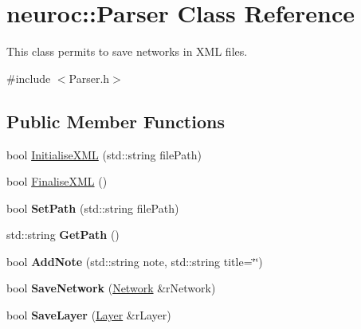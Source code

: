 \hypertarget{classneuroc_1_1_parser}{\section{neuroc\-:\-:Parser Class Reference}
\label{classneuroc_1_1_parser}
}


This class permits to save networks in X\-M\-L files.  




{\ttfamily \#include $<$Parser.\-h$>$}

\subsection*{Public Member Functions}
\begin{DoxyCompactItemize}
\item 
bool \hyperlink{classneuroc_1_1_parser_a58460a6e908e3e7690a7b85cd751c67b}{Initialise\-X\-M\-L} (std\-::string file\-Path)
\item 
bool \hyperlink{classneuroc_1_1_parser_ab4273cb1b6de10c86f2c60035a318d8b}{Finalise\-X\-M\-L} ()
\item 
\hypertarget{classneuroc_1_1_parser_a8aacc61a8f3d1d6f2afcdcc3dbd035c2}{bool {\bfseries Set\-Path} (std\-::string file\-Path)}\label{classneuroc_1_1_parser_a8aacc61a8f3d1d6f2afcdcc3dbd035c2}

\item 
\hypertarget{classneuroc_1_1_parser_a9478c163946c4e27c88e2a36f0ebf3c9}{std\-::string {\bfseries Get\-Path} ()}\label{classneuroc_1_1_parser_a9478c163946c4e27c88e2a36f0ebf3c9}

\item 
\hypertarget{classneuroc_1_1_parser_a1a04b45ac8010c431db0efc810e9cc6e}{bool {\bfseries Add\-Note} (std\-::string note, std\-::string title=\char`\"{}\char`\"{})}\label{classneuroc_1_1_parser_a1a04b45ac8010c431db0efc810e9cc6e}

\item 
\hypertarget{classneuroc_1_1_parser_a8429026329ecc911fa675d63ff84a877}{bool {\bfseries Save\-Network} (\hyperlink{classneuroc_1_1_network}{Network} \&r\-Network)}\label{classneuroc_1_1_parser_a8429026329ecc911fa675d63ff84a877}

\item 
\hypertarget{classneuroc_1_1_parser_a288ac0ae37c8b5a5739930179bb763bd}{bool {\bfseries Save\-Layer} (\hyperlink{classneuroc_1_1_layer}{Layer} \&r\-Layer)}\label{classneuroc_1_1_parser_a288ac0ae37c8b5a5739930179bb763bd}


\end{DoxyCompactItemize}

